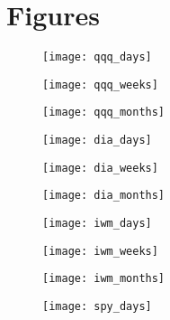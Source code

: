 \section{Figures}
\begin{figure}
\centerline{\texttt{[image: qqq\_days]}}
\caption{
\label{fig:Price_qqq_d}
}
\end{figure}

\begin{figure} 
\centerline{\texttt{[image: qqq\_weeks]}}
\caption{
\label{fig:Price_qqq_w}
}
\end{figure} 

\begin{figure} 
\centerline{\texttt{[image: qqq\_months]}}
\caption{
\label{fig:Price_qqq_m}
}
\end{figure} 

\clearpage
\begin{figure}
\centerline{\texttt{[image: dia\_days]}}
\caption{
\label{fig:Price_dia_d}
}
\end{figure}

\begin{figure} 
\centerline{\texttt{[image: dia\_weeks]}}
\caption{
\label{fig:Price_dia_w}
}
\end{figure} 

\begin{figure} 
\centerline{\texttt{[image: dia\_months]}}
\caption{
\label{fig:Price_dia_m}
}
\end{figure} 

\clearpage
\begin{figure}
\centerline{\texttt{[image: iwm\_days]}}
\caption{
\label{fig:Price_iwm_d}
}
\end{figure}

\begin{figure} 
\centerline{\texttt{[image: iwm\_weeks]}}
\caption{
\label{fig:Price_iwm_w}
}
\end{figure} 

\begin{figure} 
\centerline{\texttt{[image: iwm\_months]}}
\caption{
\label{fig:Price_iwm_m}
}
\end{figure} 

\clearpage
\begin{figure}
\centerline{\texttt{[image: spy\_days]}}
\caption{
\label{fig:Price_spy_d}
}
\end{figure}

